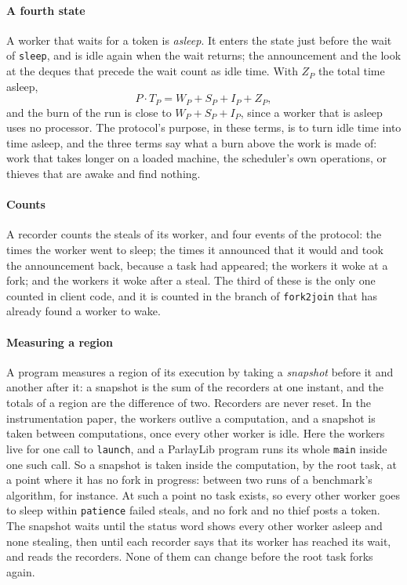 \documentclass[sigplan,nonacm]{acmart}
\begin{document}
\paragraph{A fourth state}
%
A worker that waits for a token is \emph{asleep}.
%
It enters the state just before the wait of \lstinline|sleep|, and is
idle again when the wait returns; the announcement and the look at the
deques that precede the wait count as idle time.
%
With $Z_P$ the total time asleep,
\[ P \cdot T_P = W_P + S_P + I_P + Z_P, \]
and the burn of the run is close to $W_P + S_P + I_P$, since a worker
that is asleep uses no processor.
%
The protocol's purpose, in these terms, is to turn idle time into time
asleep, and the three terms say what a burn above the work is made of:
work that takes longer on a loaded machine, the scheduler's own
operations, or thieves that are awake and find nothing.

\paragraph{Counts}
%
A recorder counts the steals of its worker, and four events of the
protocol: the times the worker went to sleep; the times it announced
that it would and took the announcement back, because a task had
appeared; the workers it woke at a fork; and the workers it woke after
a steal.
%
The third of these is the only one counted in client code, and it is
counted in the branch of \lstinline|fork2join| that has already found
a worker to wake.

\paragraph{Measuring a region}
%
A program measures a region of its execution by taking a
\emph{snapshot} before it and another after it: a snapshot is the sum
of the recorders at one instant, and the totals of a region are the
difference of two.
%
Recorders are never reset.
%
In the instrumentation paper, the workers outlive a computation, and a
snapshot is taken between computations, once every other worker is
idle.
%
Here the workers live for one call to \lstinline|launch|, and a
ParlayLib program runs its whole \lstinline|main| inside one such
call.
%
So a snapshot is taken inside the computation, by the root task, at a
point where it has no fork in progress: between two runs of a
benchmark's algorithm, for instance.
%
At such a point no task exists, so every other worker goes to sleep
within \lstinline|patience| failed steals, and no fork and no thief
posts a token.
%
The snapshot waits until the status word shows every other worker
asleep and none stealing, then until each recorder says that its
worker has reached its wait, and reads the recorders.
%
None of them can change before the root task forks again.
\end{document}
